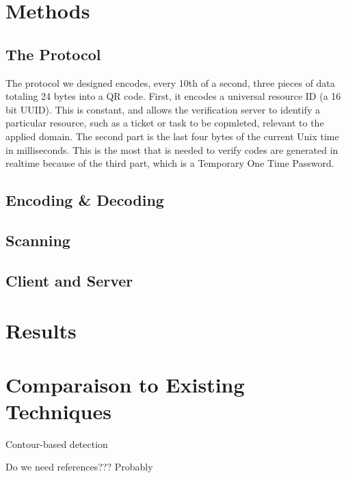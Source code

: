 \documentclass[10pt,twocolumn,letterpaper]{article}
\begin{document}
\section{Methods}

\subsection{The Protocol}

The protocol we designed encodes, every 10th of a second, three pieces of data totaling 24 bytes into a QR code. First, it encodes a universal resource ID (a 16 bit UUID). This is constant, and allows the verification server to identify a particular resource, such as a ticket or task to be copmleted, relevant to the applied domain. The second part is the last four bytes of the current Unix time in milliseconds. This is the most that is needed to verify codes are generated in realtime because of the third part, which is a Temporary One Time Password.

\subsection{Encoding \& Decoding}

\subsection{Scanning}

\subsection{Client and Server}

\section{Results}

\section{Comparaison to Existing Techniques}
Contour-based detection


Do we need references??? Probably

{\small


}
\end{document}
